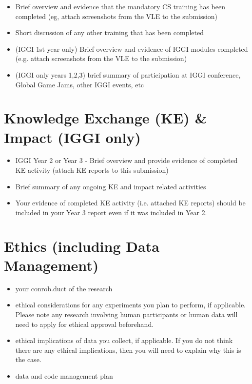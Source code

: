 \documentclass[11pt,a4paper]{article}
\begin{document}
\begin{itemize}
    \item Brief overview and evidence that the mandatory CS training has been completed (eg, attach screenshots from the VLE to the submission)
    \item Short discussion of any other training that has been completed
    \item (IGGI 1st year only) Brief overview and evidence of IGGI modules completed (e.g. attach screenshots from the VLE to the submission)
    \item (IGGI only years 1,2,3) brief summary of participation at IGGI conference, Global Game Jams, other IGGI events, etc 
\end{itemize}

\section{Knowledge Exchange (KE) \& Impact (IGGI only)}
\begin{itemize}
    \item IGGI Year 2 or Year 3 - Brief overview and provide evidence of completed KE activity (attach KE reports to this submission)
    \item Brief summary of any ongoing KE and impact related activities
    \item Your evidence of completed KE activity (i.e. attached KE reports) should be included in your Year 3 report even if it was included in Year 2. 
\end{itemize}

\section{Ethics (including Data Management)}
\begin{itemize}
    \item your conrob.duct of the research 
    \item ethical considerations for  any experiments you plan to perform, if applicable. Please note any research involving human participants or human data will need to apply for ethical approval beforehand. 
    \item ethical implications of data you collect, if applicable. If you do not think there are any ethical implications, then you will need to explain why this is the case. 
    \item data and code management plan 
\end{itemize}
\end{document}
